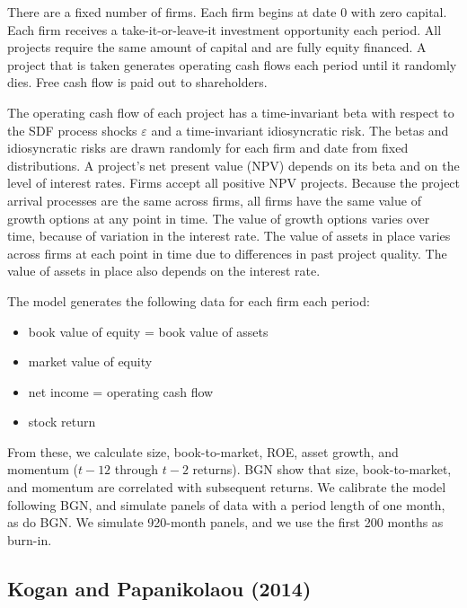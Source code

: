 \documentclass[12pt]{scrarticle}
\begin{document}
There are a fixed number of firms.  Each firm begins at date 0 with zero capital.  Each firm receives a take-it-or-leave-it investment opportunity each period.  All projects require the same amount of capital and are fully equity financed.  A project that is taken generates operating cash flows each period until it randomly dies.  Free cash flow is paid out to shareholders.

The operating cash flow of each project has a time-invariant beta with respect to the SDF process shocks $\varepsilon$ and a time-invariant idiosyncratic risk.  The betas and idiosyncratic risks are drawn randomly for each firm and date from fixed distributions.  A project's net present value (NPV) depends on its beta and on the level of interest rates. Firms accept all positive NPV projects.  Because the project arrival processes are the same across firms, all firms have the same value of growth options at any point in time.  The value of growth options varies over time, because of variation in the interest rate.  The value of assets in place varies across firms at each point in time due to differences in past project quality.  The value of assets in place also depends on the interest rate. 

The model generates the following data for each firm each period: 
\begin{itemize}\setlength\itemsep{0pt}
\item book value of equity = book value of assets
\item market value of equity
\item net income = operating cash flow
\item stock return
\end{itemize}
From these, we calculate size, book-to-market, ROE, asset growth, and momentum ($t-12$ through $t-2$ returns).  BGN show that size, book-to-market, and momentum are correlated with subsequent returns. We calibrate the model following BGN, and simulate \numpanels panels of data with a period length of one month, as do BGN. We simulate 920-month panels, and we use the first 200 months as burn-in.

\subsection{Kogan and Papanikolaou (2014)}
\end{document}
